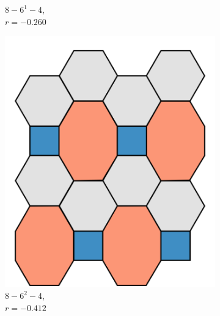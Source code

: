 \begin{figure}[h!]
\begin{subfigure}[b]{0.15\textwidth}
         \caption{$8 - 6^1 - 4$, \\$r=-0.260$}
         \label{appfig:8614}
     \end{subfigure}
     \hfill
      \begin{subfigure}[b]{0.15\textwidth}
         \centering
         \includegraphics[width=\textwidth]{./appendices/figures/crystal_8_62_4.pdf}
         \caption{$8 - 6^2 - 4$, \\$r=-0.412$}
         \label{appfig:8624}
     \end{subfigure}
     \hfill
      \begin{subfigure}[b]{0.15\textwidth}
         \centering

\end{subfigure}
\end{figure}
